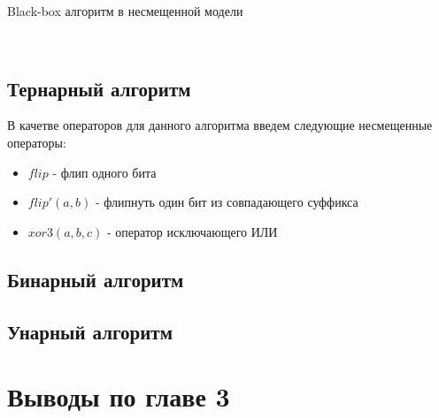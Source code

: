 \begin{algorithm}[H]
 \caption{Black-box алгоритм в несмещенной модели}
 \label{lst:ea}
 \begin{algorithmic}[1]
     \\
    \EndFor
\end{algorithmic}
\end{algorithm}


\subsection{Тернарный алгоритм}
В качетве операторов для данного алгоритма введем следующие несмещенные операторы: 
\begin{itemize}
   \item $flip$ - флип одного бита
   \item $flip'(a, b)$ - флипнуть один бит из совпадающего суффикса
   \item $xor3(a,b,c)$ - оператор исключающего ИЛИ
\end{itemize}
\subsection{Бинарный алгоритм}
\subsection{Унарный алгоритм}
\section{Выводы по главе 3}